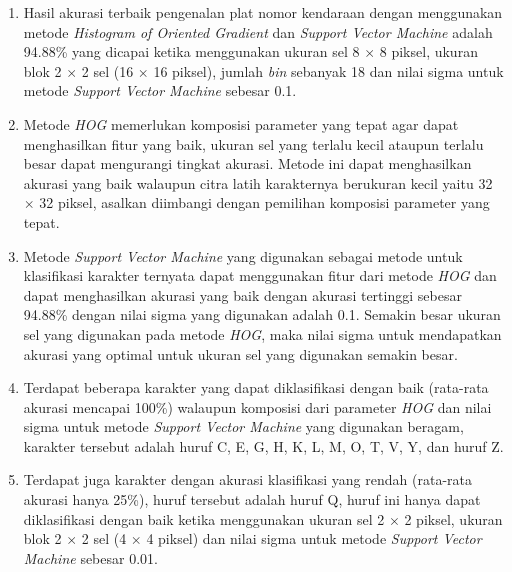 \begin{enumerate}
\item Hasil akurasi terbaik pengenalan plat nomor kendaraan dengan menggunakan metode \textit{Histogram of Oriented Gradient} dan \textit{Support Vector Machine} adalah 94.88\% yang dicapai ketika menggunakan ukuran sel 8 $\times$ 8 piksel, ukuran blok 2 $\times$ 2 sel (16 $\times$ 16 piksel), jumlah \textit{bin} sebanyak 18 dan nilai sigma untuk metode \textit{Support Vector Machine} sebesar 0.1.

\item  Metode \textit{HOG} memerlukan komposisi parameter yang tepat agar dapat menghasilkan fitur yang baik, ukuran sel yang terlalu kecil ataupun terlalu besar dapat mengurangi tingkat akurasi. Metode ini dapat menghasilkan akurasi yang baik walaupun citra latih karakternya berukuran kecil yaitu 32 $\times$ 32 piksel, asalkan diimbangi dengan pemilihan komposisi parameter yang tepat.

\item Metode \textit{Support Vector Machine} yang digunakan sebagai metode untuk klasifikasi karakter ternyata dapat menggunakan fitur dari metode \textit{HOG} dan dapat menghasilkan akurasi yang baik dengan akurasi tertinggi sebesar 94.88\% dengan nilai sigma yang digunakan adalah 0.1. Semakin besar ukuran sel yang digunakan pada metode \textit{HOG}, maka nilai sigma untuk mendapatkan akurasi yang optimal untuk ukuran sel yang digunakan semakin besar.

\item Terdapat beberapa karakter yang dapat diklasifikasi dengan baik (rata-rata akurasi mencapai 100\%) walaupun komposisi dari parameter \textit{HOG} dan nilai sigma untuk metode \textit{Support Vector Machine} yang digunakan beragam, karakter tersebut adalah huruf C, E, G, H, K, L, M, O, T, V, Y, dan huruf Z.

\item Terdapat juga karakter dengan akurasi klasifikasi yang rendah (rata-rata akurasi hanya 25\%), huruf tersebut adalah huruf Q, huruf ini hanya dapat diklasifikasi dengan baik ketika menggunakan ukuran sel 2 $\times$ 2 piksel, ukuran blok 2 $\times$ 2 sel (4 $\times$ 4 piksel) dan nilai sigma untuk metode \textit{Support Vector Machine} sebesar 0.01.\\
\end{enumerate}

